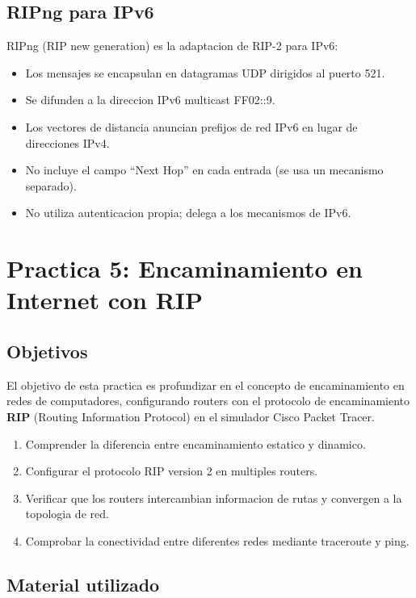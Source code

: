 \subsection{RIPng para IPv6}

RIPng (RIP new generation) es la adaptacion de RIP-2 para IPv6:
\begin{itemize}
    \item Los mensajes se encapsulan en datagramas UDP dirigidos al puerto 521.
    \item Se difunden a la direccion IPv6 multicast FF02::9.
    \item Los vectores de distancia anuncian prefijos de red IPv6 en lugar de
    direcciones IPv4.
    \item No incluye el campo ``Next Hop'' en cada entrada (se usa un mecanismo
    separado).
    \item No utiliza autenticacion propia; delega a los mecanismos de IPv6.
\end{itemize}


\section{Practica 5: Encaminamiento en Internet con RIP}
\label{sec:practica5}

\subsection{Objetivos}

El objetivo de esta practica es profundizar en el concepto de encaminamiento en
redes de computadores, configurando routers con el protocolo de encaminamiento
\textbf{RIP} (Routing Information Protocol) en el simulador Cisco Packet Tracer.

\begin{enumerate}
    \item Comprender la diferencia entre encaminamiento estatico y dinamico.
    \item Configurar el protocolo RIP version 2 en multiples routers.
    \item Verificar que los routers intercambian informacion de rutas y convergen
    a la topologia de red.
    \item Comprobar la conectividad entre diferentes redes mediante traceroute y ping.
\end{enumerate}

\subsection{Material utilizado}

